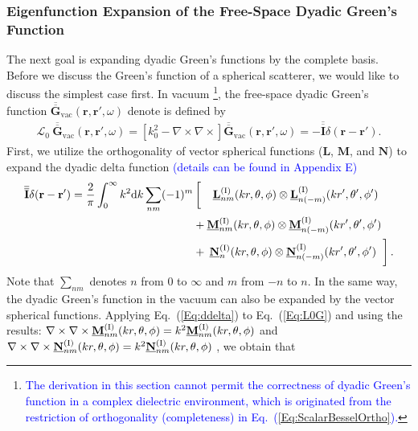 \documentclass[journal=jacsat,manuscript=article,layout=traditional]{achemso}
\newcommand*\br{\mathbf{r}}
\newcommand*\blue[1]{\textcolor{blue}{#1}}
\newcommand*\tensorg{\overline{\overline{\mathbf{G}}}}
\newcommand*\tensori{\overline{\overline{\mathbf{I}}}}
\newcommand{\norF}[1]{\underline{\vb{#1}}}
\newcommand{\RomanI}{\scriptsize\textrm{I}}
\begin{document}
\subsubsection{Eigenfunction Expansion of the Free-Space Dyadic Green's Function}
The next goal is expanding dyadic Green's functions by the complete basis.
Before we discuss the Green's function of a spherical scatterer, we would like to discuss the simplest case first.
In vacuum \footnote{\blue{The derivation in this section cannot permit the correctness of dyadic Green's function in a complex dielectric environment, which is originated from the restriction of orthogonality (completeness) in Eq.~(\ref{Eq:ScalarBesselOrtho}).}}, the free-space dyadic Green's function $\tensorg_\mathrm{vac}(\br,\br',\omega)$ denote is defined by
\begin{align}
    \mathcal{L}_0~\tensorg_\mathrm{vac}(\br,\br',\omega)
    =\left[k_0^2-\nabla\times\nabla\times\right]
    \tensorg_\mathrm{vac}(\br,\br',\omega)=-\tensori\delta(\mathbf{r-r'}).
    \label{Eq:L0G}
\end{align}
First, we utilize the orthogonality of vector spherical functions ($\mathbf{L}$, $\mathbf{M}$, and $\mathbf{N}$) to expand the dyadic delta function \blue{(details can be found in Appendix E)}
\begin{align}
    \nonumber
    \tensori\delta(\vb{r}-\vb{r'})=\frac{2}{\pi}\int_0^\infty k^2\mathrm{d}k
    \sum_{nm}(-1)^m
    &\left[\vphantom{\frac{a^2}{b^2}}\right. \hspace{.268cm}
    \norF{L}_{nm}^{(\RomanI)}(kr,\theta,\phi) \otimes \norF{L}_{n(-m)}^{(\RomanI)}(kr',\theta',\phi') \\
    \nonumber
    &+\norF{M}_{nm}^{(\RomanI)}(kr,\theta,\phi) \otimes \norF{M}_{n(-m)}^{(\RomanI)}(kr',\theta',\phi') \\
    &+\hspace{.08cm}\norF{N}_{n}^{(\RomanI)}(kr,\theta,\phi) \otimes \norF{N}_{n(-m)}^{(\RomanI)}(kr',\theta',\phi') 
    \hspace{.1cm}\left.\vphantom{\frac{a^2}{b^2}}\right].
    \label{Eq:ddelta}
\end{align}
Note that $\sum_{nm}$ denotes $n$ from $0$ to $\infty$ and $m$ from $-n$ to $n$. 
In the same way, the dyadic Green's function in the vacuum can also be expanded by the vector spherical functions.
Applying Eq.~(\ref{Eq:ddelta}) to Eq.~(\ref{Eq:L0G}) and using the results: $\nabla\times\nabla\times\norF{M}_{nm}^{(\RomanI)}(kr,\theta,\phi)=k^2\norF{M}_{nm}^{(\RomanI)}(kr,\theta,\phi)$ and $\nabla\times\nabla\times\norF{N}_{nm}^{(\RomanI)}(kr,\theta,\phi)=k^2\norF{N}_{nm}^{(\RomanI)}(kr,\theta,\phi)$ , we obtain that
\end{document}
